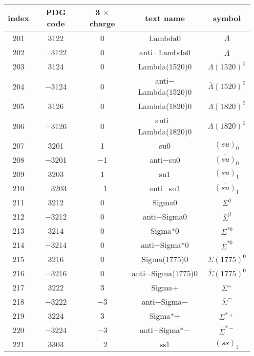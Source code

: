 \documentclass{article}
\begin{document}
\clearpage

\begin{table}[!htbp]
\centering
\begin{tabular}{|c|c|c|c|c|}
\hline
index & PDG code & 3 $\times$ charge & text name & symbol \\
\hline
201 & 3122 & 0 & Lambda0 & $\Lambda$ \\
\hline
202 & $-$3122 & 0 & anti$-$Lambda0 & $\bar{\Lambda}$ \\
\hline
203 & 3124 & 0 & Lambda(1520)0 & $\Lambda(1520)^{0}$ \\
\hline
204 & $-$3124 & 0 & anti$-$Lambda(1520)0 & $\bar{\Lambda}(1520)^{0}$ \\
\hline
205 & 3126 & 0 & Lambda(1820)0 & $\Lambda(1820)^{0}$ \\
\hline
206 & $-$3126 & 0 & anti$-$Lambda(1820)0 & $\bar{\Lambda}(1820)^{0}$ \\
\hline
207 & 3201 & 1 & su\underline{\hspace{0.6em}}0 & $(su)_0$ \\
\hline
208 & $-$3201 & $-$1 & anti$-$su\underline{\hspace{0.6em}}0 & $\bar{(su)}_0$ \\
\hline
209 & 3203 & 1 & su\underline{\hspace{0.6em}}1 & $(su)_{1}$ \\
\hline
210 & $-$3203 & $-$1 & anti$-$su\underline{\hspace{0.6em}}1 & $\bar{(su)}_{1}$ \\
\hline
211 & 3212 & 0 & Sigma0 & $\Sigma^{0}$ \\
\hline
212 & $-$3212 & 0 & anti$-$Sigma0 & $\bar{\Sigma}^{0}$ \\
\hline
213 & 3214 & 0 & Sigma*0 & $\Sigma^{*0}$ \\
\hline
214 & $-$3214 & 0 & anti$-$Sigma*0 & $\bar{\Sigma}^{*0}$ \\
\hline
215 & 3216 & 0 & Sigma(1775)0 & $\Sigma(1775)^{0}$ \\
\hline
216 & $-$3216 & 0 & anti$-$Sigma(1775)0 & $\bar{\Sigma}(1775)^{0}$ \\
\hline
217 & 3222 & 3 & Sigma$+$ & $\Sigma^{+}$ \\
\hline
218 & $-$3222 & $-$3 & anti$-$Sigma$-$ & $\bar{\Sigma}^{-}$ \\
\hline
219 & 3224 & 3 & Sigma*$+$ & $\Sigma^{*+}$ \\
\hline
220 & $-$3224 & $-$3 & anti$-$Sigma*$-$ & $\bar{\Sigma}^{*-}$ \\
\hline
221 & 3303 & $-$2 & ss\underline{\hspace{0.6em}}1 & $(ss)_{1}$ \\

\end{tabular}
\end{table}
\end{document}
